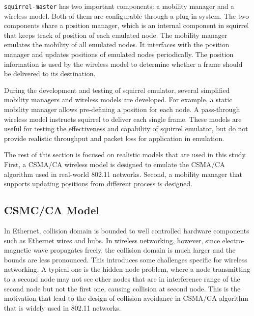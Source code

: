 \documentclass[12pt]{report}
\begin{document}
\texttt{squirrel-master} has two important components: a mobility manager and a wireless model. Both of them are configurable through a plug-in system. The two components share a position manager, which is an internal component in squirrel that keeps track of position of each emulated node. The mobility manager emulates the mobility of all emulated nodes. It interfaces with the position manager and updates positions of emulated nodes periodically. The position information is used by the wireless model to determine whether a frame should be delivered to its destination.

During the development and testing of squirrel emulator, several simplified mobility managers and wireless models are developed. For example, a static mobility manager allows pre-defining a position for each node. A pass-through wireless model instructs squirrel to deliver each single frame. These models are useful for testing the effectiveness and capability of squirrel emulator, but do not provide realistic throughput and packet loss for application in emulation.

The rest of this section is focused on realistic models that are used in this study. First, a CSMA/CA wireless model is designed to emulate the CSMA/CA algorithm used in real-world 802.11 networks. Second, a mobility manager that supports updating positions from different process is designed.

\subsection{CSMC/CA Model}
\label{sec:squirrel_csmaca}

In Ethernet, collision domain is bounded to well controlled hardware components such as Ethernet wires and hubs. In wireless networking, however, since electro-magnetic wave propagates freely, the collision domain is much larger and the bounds are less pronounced. This introduces some challenges specific for wireless networking. A typical one is the hidden node problem, where a node transmitting to a second node may not see other nodes that are in interference range of the second node but not the first one, causing collision at second node. This is the motivation that lead to the design of collision avoidance in CSMA/CA algorithm that is widely used in 802.11 networks.
\end{document}
